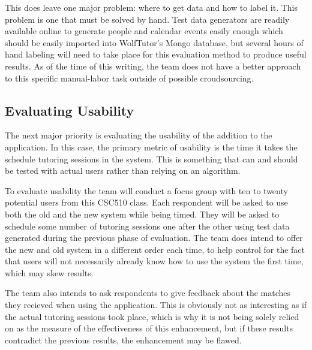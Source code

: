 This does leave one major problem: where to get data and how to
label it.  This problem is one that must be solved by hand.  Test data
generators are readily available online to generate people and
calendar events easily enough which should be easily imported into
WolfTutor's Mongo database, but several hours of hand labeling will
need to take place for this evaluation method to produce useful
results.  As of the time of this writing, the team does not have a
better approach to this specific manual-labor task outside of possible
croudsourcing.  

\subsection{Evaluating Usability}
\label{sec:evaluating-usability}
The next major priority is evaluating the usability of the addition to
the application.  In this case, the primary metric of usability is the
time it takes the schedule tutoring sessions in the system.  This is
something that can and should be tested with actual users rather than
relying on an algorithm.  

To evaluate usability the team will conduct a focus group with ten to
twenty potential users from this CSC510 class.  Each respondent will
be asked to use both the old and the new system while being timed.
They will be asked to schedule some number of tutoring sessions one
after the other using test data generated during the previous phase of
evaluation.  The team does intend to offer the new and old system in
a different order each time, to help control for the fact that users
will not necessarily already know how to use the system the first
time, which may skew results.  

The team also intends to ask respondents to give feedback about the
matches they recieved when using the application.  This is obviously
not as interesting as if the actual tutoring sessions took place,
which is why it is not being solely relied on as the measure of the
effectiveness of this enhancement, but if these results contradict the
previous results, the enhancement may be flawed.

